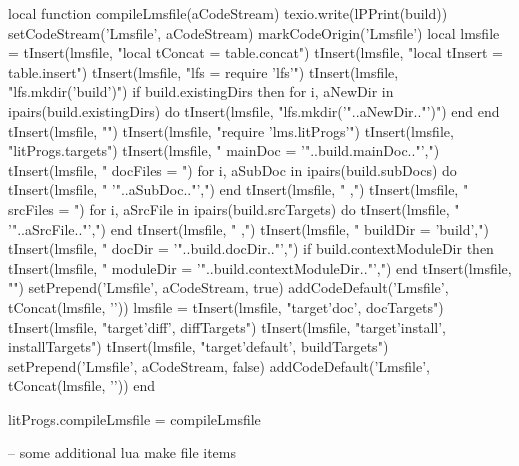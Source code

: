 \startLuaCode
local function compileLmsfile(aCodeStream)
  texio.write(lPPrint(build))
  setCodeStream('Lmsfile', aCodeStream)
  markCodeOrigin('Lmsfile')
  local lmsfile = {}
  tInsert(lmsfile, "local tConcat = table.concat")
  tInsert(lmsfile, "local tInsert = table.insert\n")
  tInsert(lmsfile, "lfs = require 'lfs'\n")
  tInsert(lmsfile, "lfs.mkdir('build')")
  if build.existingDirs then
    for i, aNewDir in ipairs(build.existingDirs) do
      tInsert(lmsfile, "lfs.mkdir('"..aNewDir.."')")
    end
  end
  tInsert(lmsfile, "")
  tInsert(lmsfile, "require 'lms.litProgs'\n")
  tInsert(lmsfile, "litProgs.targets{")
  tInsert(lmsfile, "  mainDoc  = '"..build.mainDoc.."',")
  tInsert(lmsfile, "  docFiles = {")
  for i, aSubDoc in ipairs(build.subDocs) do
    tInsert(lmsfile, "    '"..aSubDoc.."',")
  end
  tInsert(lmsfile, "  },")
  tInsert(lmsfile, "  srcFiles = {")
  for i, aSrcFile in ipairs(build.srcTargets) do
    tInsert(lmsfile, "    '"..aSrcFile.."',")
  end
  tInsert(lmsfile, "  },")
  tInsert(lmsfile, "  buildDir  = 'build',")
  tInsert(lmsfile, "  docDir    = '"..build.docDir.."',")
  if build.contextModuleDir then
    tInsert(lmsfile, "  moduleDir = '"..build.contextModuleDir.."',")
  end
  tInsert(lmsfile, "}")
  setPrepend('Lmsfile', aCodeStream, true)
  addCodeDefault('Lmsfile', tConcat(lmsfile, '\n'))
  lmsfile = {}
  tInsert(lmsfile, "target{'doc',     docTargets}")
  tInsert(lmsfile, "target{'diff',    diffTargets}")
  tInsert(lmsfile, "target{'install', installTargets}")
  tInsert(lmsfile, "target{'default', buildTargets}")
  setPrepend('Lmsfile', aCodeStream, false)
  addCodeDefault('Lmsfile', tConcat(lmsfile, '\n'))
end

litProgs.compileLmsfile = compileLmsfile
\stopLuaCode

\startLmsfile
-- some additional lua make file items
\stopLmsfile

\stopchapter